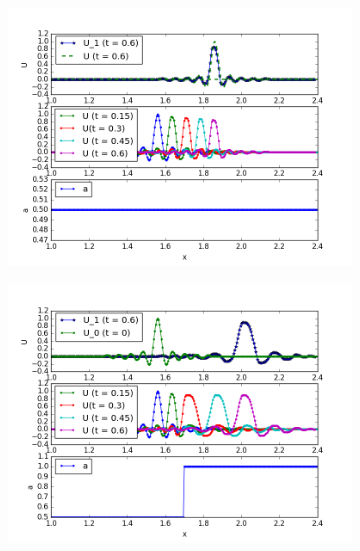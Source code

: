 \documentclass{article}
\begin{document}
\begin{figure}[h]
    \caption{Пик}
    \begin{subfigure}{0.33\textwidth}
    \includegraphics[width=1\linewidth]{TVD_tests/lim_MC_a_const_U0_peack.png}
    \end{subfigure}
    \begin{subfigure}{0.33\textwidth}
    \includegraphics[width=1\linewidth]{TVD_tests/lim_MC_a_devided_U0_peack.png}
    \end{subfigure}
    \begin{subfigure}{0.33\textwidth}

\end{subfigure}
\end{figure}
\end{document}
